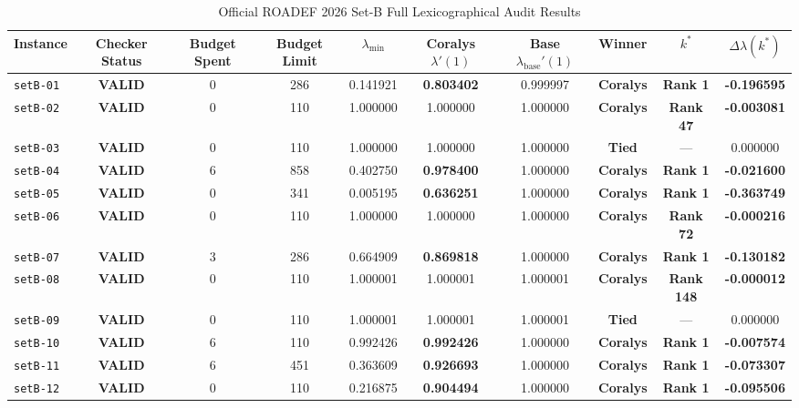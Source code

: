 \documentclass[10pt,journal,compsoc]{IEEEtran}
\begin{document}
\begin{table}[t]
\centering
\caption{Official ROADEF 2026 Set-B Full Lexicographical Audit Results}
\label{tab:setb_results}
\begin{tabular}{lccccccccc}
\toprule
\textbf{Instance} & \textbf{Checker Status} & \textbf{Budget Spent} & \textbf{Budget Limit} & $\lambda_{\min}$ & \textbf{Coralys $\lambda'(1)$} & \textbf{Base $\lambda_{\text{base}}'(1)$} & \textbf{Winner} & $k^*$ & $\Delta\lambda(k^*)$ \\
\midrule
\texttt{setB-01} & \textbf{VALID} & 0 & 286 & 0.141921 & \textbf{0.803402} & 0.999997 & \textbf{Coralys} & \textbf{Rank 1} & \textbf{-0.196595} \\
\texttt{setB-02} & \textbf{VALID} & 0 & 110 & 1.000000 & 1.000000 & 1.000000 & \textbf{Coralys} & \textbf{Rank 47} & \textbf{-0.003081} \\
\texttt{setB-03} & \textbf{VALID} & 0 & 110 & 1.000000 & 1.000000 & 1.000000 & \textbf{Tied} & — & 0.000000 \\
\texttt{setB-04} & \textbf{VALID} & 6 & 858 & 0.402750 & \textbf{0.978400} & 1.000000 & \textbf{Coralys} & \textbf{Rank 1} & \textbf{-0.021600} \\
\texttt{setB-05} & \textbf{VALID} & 0 & 341 & 0.005195 & \textbf{0.636251} & 1.000000 & \textbf{Coralys} & \textbf{Rank 1} & \textbf{-0.363749} \\
\texttt{setB-06} & \textbf{VALID} & 0 & 110 & 1.000000 & 1.000000 & 1.000000 & \textbf{Coralys} & \textbf{Rank 72} & \textbf{-0.000216} \\
\texttt{setB-07} & \textbf{VALID} & 3 & 286 & 0.664909 & \textbf{0.869818} & 1.000000 & \textbf{Coralys} & \textbf{Rank 1} & \textbf{-0.130182} \\
\texttt{setB-08} & \textbf{VALID} & 0 & 110 & 1.000001 & 1.000001 & 1.000001 & \textbf{Coralys} & \textbf{Rank 148} & \textbf{-0.000012} \\
\texttt{setB-09} & \textbf{VALID} & 0 & 110 & 1.000001 & 1.000001 & 1.000001 & \textbf{Tied} & — & 0.000000 \\
\texttt{setB-10} & \textbf{VALID} & 6 & 110 & 0.992426 & \textbf{0.992426} & 1.000000 & \textbf{Coralys} & \textbf{Rank 1} & \textbf{-0.007574} \\
\texttt{setB-11} & \textbf{VALID} & 6 & 451 & 0.363609 & \textbf{0.926693} & 1.000000 & \textbf{Coralys} & \textbf{Rank 1} & \textbf{-0.073307} \\
\texttt{setB-12} & \textbf{VALID} & 0 & 110 & 0.216875 & \textbf{0.904494} & 1.000000 & \textbf{Coralys} & \textbf{Rank 1} & \textbf{-0.095506} \\
\bottomrule
\end{tabular}
\end{table}
\end{document}
